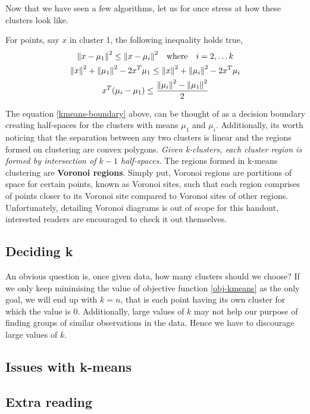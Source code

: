 \documentclass[12pt,a4paper]{article}
\begin{document}
Now that we have seen a few algorithms, let us for once stress at how these clusters look like.

For points, say $x$ in cluster 1, the following inequality holds true,
\begin{gather}
    \norm{x- \mu_1}^2 \leq \norm{x-\mu_i}^2 \quad \text{where} \quad i=2, \dots k \nonumber\\
    \norm{x}^2 + \norm{\mu_1}^2 - 2x^T\mu_1 \leq \norm{x}^2 + \norm{\mu_i}^2 - 2x^T\mu_i \nonumber \\
    x^T(\mu_i-\mu_1) \leq \dfrac{\norm{\mu_i}^2 - \norm{\mu_1}^2}{2} \label{kmeans-boundary}
\end{gather}

The equation \eqref{kmeans-boundary} above, can be thought of as a decision boundary creating half-spaces for the clusters with means $\mu_1$ and $\mu_i$.  Additionally, its worth noticing that the separation between any two clusters is linear and the regions formed on clustering are convex polygons. \textit{Given k-clusters, each cluster region is formed by intersection of $k-1$ half-spaces.} The regions formed in k-means clustering are \textbf{Voronoi regions}. Simply put, Voronoi regions are partitions of space for certain points, known as Voronoi sites, such that each region comprises of points closer to its Voronoi site compared to Voronoi sites of other regions. Unfortunately, detailing Voronoi diagrams is out of scope for this handout, interested readers are encouraged to check it out themselves.

\subsection{Deciding k}
An obvious question is, once given data, how many clusters should we choose? If we only keep minimising the value of objective function \eqref{obj-kmeans} as the only goal, we will end up with $k=n$, that is each point having its own cluster for which the value is 0. Additionally, large values of $k$ may not help our purpose of finding  groups of similar observations in the data. Hence we have to discourage large values of $k$.

\subsection{Issues with k-means}

\subsection{Extra reading}
\end{document}
